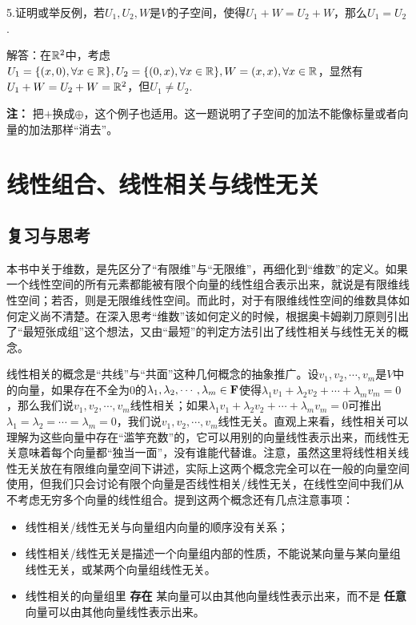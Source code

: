\documentclass[hyperref,]{ctexart}
\providecommand{\tightlist}{%
  \setlength{\itemsep}{0pt}\setlength{\parskip}{0pt}}
\begin{document}
\bigskip

\noindent{}
5.证明或举反例，若\(U_1,U_2,W\)是\(V\)的子空间，使得\(U_1+ W=U_2+ W\)，那么\(U_1=U_2\).

\noindent{}解答：在\(\mathbb{R}^2\)中，考虑\(U_1=\{(x,0),\forall x\in \mathbb{R}\}, U_2=\{(0,x),\forall x\in \mathbb{R}\}, W={(x,x),\forall x\in\mathbb{R}}\)，显然有\(U_1+W=U_2+W=\mathbb{R}^2\)，但\(U_1\ne U_2\).

\noindent{} \textbf{注：}
把\(+\)换成\(\oplus\)，这个例子也适用。这一题说明了子空间的加法不能像标量或者向量的加法那样``消去''。

\section{线性组合、线性相关与线性无关}\label{ux7ebfux6027ux7ec4ux5408ux7ebfux6027ux76f8ux5173ux4e0eux7ebfux6027ux65e0ux5173}

\subsection{复习与思考}\label{ux590dux4e60ux4e0eux601dux8003-1}

本书中关于维数，是先区分了``有限维''与``无限维''，再细化到``维数''的定义。如果一个线性空间的所有元素都能被有限个向量的线性组合表示出来，就说是有限维线性空间；若否，则是无限维线性空间。而此时，对于有限维线性空间的维数具体如何定义尚不清楚。在深入思考``维数''该如何定义的时候，根据奥卡姆剃刀原则引出了``最短张成组''这个想法，又由``最短''的判定方法引出了线性相关与线性无关的概念。

线性相关的概念是``共线''与``共面''这种几何概念的抽象推广。设\(v_1,v_2,\cdots,v_m\)是\(V\)中的向量，如果存在不全为0的\(\lambda_1,\lambda_2,\cdots,\lambda_m\in \mathbf{F}\)使得\(\lambda_1 v_1+\lambda_2 v_2+\cdots+\lambda_m v_m=0\)，那么我们说\(v_1,v_2,\cdots,v_m\)线性相关；如果\(\lambda_1 v_1+\lambda_2 v_2+\cdots+\lambda_m v_m=0\)可推出\(\lambda_1=\lambda_2=\cdots=\lambda_m=0\)，我们说\(v_1,v_2,\cdots,v_m\)线性无关。直观上来看，线性相关可以理解为这些向量中存在``滥竽充数''的，它可以用别的向量线性表示出来，而线性无关意味着每个向量都``独当一面''，没有谁能代替谁。注意，虽然这里将线性相关线性无关放在有限维向量空间下讲述，实际上这两个概念完全可以在一般的向量空间使用，但我们只会讨论有限个向量是否线性相关/线性无关，在线性空间中我们从不考虑无穷多个向量的线性组合。提到这两个概念还有几点注意事项：

\begin{itemize}
\tightlist
\item
  线性相关/线性无关与向量组内向量的顺序没有关系；
\item
  线性相关/线性无关是描述一个向量组内部的性质，不能说某向量与某向量组线性无关，或某两个向量组线性无关。
\item
  线性相关的向量组里 \textbf{存在}
  某向量可以由其他向量线性表示出来，而不是 \textbf{任意}
  向量可以由其他向量线性表示出来。
\end{itemize}
\end{document}
